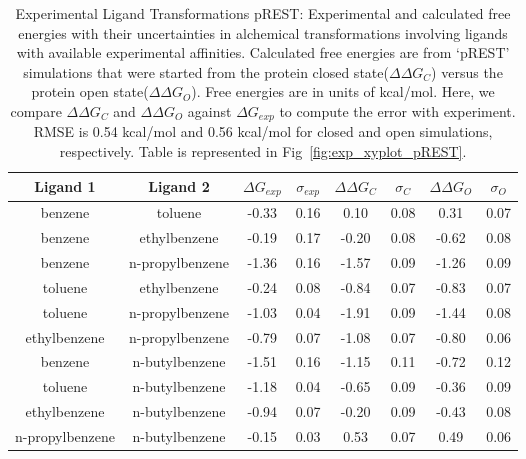 \begin{table}[!htb]
\centering
\caption{Experimental Ligand Transformations pREST:
Experimental and calculated free energies with their uncertainties in alchemical transformations involving ligands with available experimental affinities.
Calculated free energies are from `pREST' simulations that were started from the protein closed state(\boldmath$\Delta\Delta G_{C}$) versus the protein open state(\boldmath$\Delta\Delta G_{O}$). 
 Free energies are in units of kcal/mol.
 Here, we compare \boldmath$\Delta\Delta G_{C}$ and \boldmath$\Delta\Delta G_{O}$ against \boldmath$\Delta G_{exp}$ to compute the error with experiment.
 RMSE is 0.54 kcal/mol and 0.56 kcal/mol for closed and open simulations, respectively.
 Table is represented in Fig~\ref{fig:exp_xyplot_pREST}.
}
\label{tbl:exp_pREST_set}
\begin{tabular}{|c|c|c|c|c|c|c|c|}
\hline
\textbf{Ligand 1} & \textbf{Ligand 2} & \boldmath$\Delta G_{exp}$  & \boldmath$\sigma_{exp}$ & \boldmath$\Delta\Delta G_{C}$ & \boldmath$\sigma_{C}$ & \boldmath$\Delta\Delta G_{O}$ & \boldmath$\sigma_{O}$ \\ \hline
benzene         & toluene         & -0.33        & 0.16            & 0.10       & 0.08          & 0.31       & 0.07          \\ \hline
benzene         & ethylbenzene    &-0.19 & 0.17  & -0.20 & 0.08  & -0.62 & 0.08          \\ \hline
benzene         & n-propylbenzene & -1.36 & 0.16 & -1.57 & 0.09  & -1.26 & 0.09         \\ \hline
toluene         & ethylbenzene    & -0.24 & 0.08  & -0.84 & 0.07  & -0.83 & 0.07          \\ \hline
toluene         & n-propylbenzene & -1.03 & 0.04  & -1.91 & 0.09  & -1.44 & 0.08          \\ \hline
ethylbenzene    & n-propylbenzene & -0.79 & 0.07  & -1.08 & 0.07  & -0.80 & 0.06         \\ \hline
benzene         & n-butylbenzene  & -1.51 & 0.16 & -1.15 & 0.11  & -0.72 & 0.12         \\ \hline
toluene         & n-butylbenzene  & -1.18 & 0.04  & -0.65 & 0.09  & -0.36 & 0.09         \\ \hline
ethylbenzene    & n-butylbenzene  & -0.94 & 0.07  & -0.20 & 0.09  & -0.43 & 0.08         \\ \hline
n-propylbenzene & n-butylbenzene  & -0.15 & 0.03  & 0.53  & 0.07  & 0.49  & 0.06       \\ \hline
\end{tabular}
\end{table}
